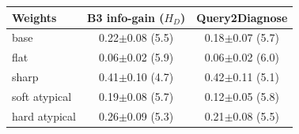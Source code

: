 \begin{tabular}{lcc}
\toprule
Weights & B3 info-gain ($H_D$) & Query2Diagnose \\
\midrule
base & 0.22$\pm$0.08 (5.5) & 0.18$\pm$0.07 (5.7) \\
flat & 0.06$\pm$0.02 (5.9) & 0.06$\pm$0.02 (6.0) \\
sharp & 0.41$\pm$0.10 (4.7) & 0.42$\pm$0.11 (5.1) \\
soft atypical & 0.19$\pm$0.08 (5.7) & 0.12$\pm$0.05 (5.8) \\
hard atypical & 0.26$\pm$0.09 (5.3) & 0.21$\pm$0.08 (5.5) \\
\bottomrule
\end{tabular}
